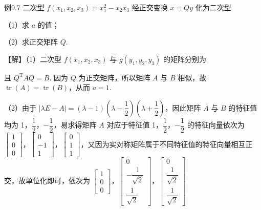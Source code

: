 \begin{fcard}{例9.7}
二次型 $f(x_1,x_2,x_3)=x_1^2-x_2x_3$ 经正交变换 $x=Qy$ 化为二次型


（1）求 $a$ 的值；

（2）求正交矩阵 $Q$.


【解】（1）二次型 $f(x_1,x_2,x_3)$ 与 $g(y_1,y_2,y_3)$ 的矩阵分别为


且 $Q^{\mathrm T}AQ=B$. 因为 $Q$ 为正交矩阵，所以矩阵 $A$ 与 $B$ 相似，故 $\operatorname{tr}(A)=\operatorname{tr}(B)$，从而 $a=1$.

（2）由于 $|\lambda E-A|=(\lambda-1)\left(\lambda-\dfrac12\right)\left(\lambda+\dfrac12\right)$，因此矩阵 $A$ 与 $B$ 的特征值均为 1，$\dfrac12$，$-\dfrac12$，易求得矩阵 $A$ 对应于特征值 1，$\dfrac12$，$-\dfrac12$ 的特征向量依次为 $\begin{bmatrix}1\\0\\0\end{bmatrix}$，$\begin{bmatrix}0\\-1\\1\end{bmatrix}$，$\begin{bmatrix}0\\1\\1\end{bmatrix}$，又因为实对称矩阵属于不同特征值的特征向量相互正交，故单位化即可，依次为 $\begin{bmatrix}1\\0\\0\end{bmatrix}$，$\begin{bmatrix}0\\-\dfrac{1}{\sqrt2}\\[6pt]\dfrac{1}{\sqrt2}\end{bmatrix}$，$\begin{bmatrix}0\\\dfrac{1}{\sqrt2}\\[6pt]\dfrac{1}{\sqrt2}\end{bmatrix}$


\end{fcard}
